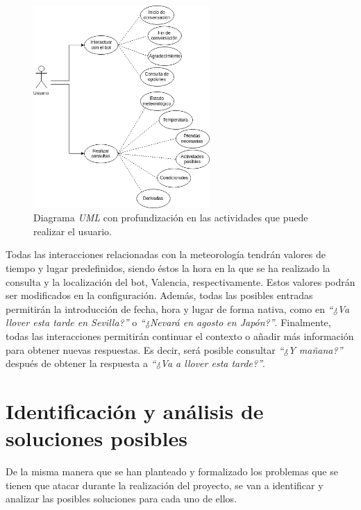 \documentclass[11pt,spanish,listoffigures]{tfgetsinf}
\begin{document}
\begin{figure}[h!]
    \centering
    \includegraphics[width=0.6\textwidth]{images/img04.png}
    \caption{Diagrama \textit{UML} con profundización en las actividades que puede realizar el usuario.}
    \label{fig:UML2}
\end{figure}

Todas las interacciones relacionadas con la meteorología tendrán valores de tiempo y lugar predefinidos, siendo éstos la hora en la que se ha realizado la consulta y la localización del bot, Valencia, respectivamente. Estos valores podrán ser modificados en la configuración. Además, todas las posibles entradas permitirán la introducción de fecha, hora y lugar de forma nativa, como en \textit{“¿Va llover esta tarde en Sevilla?”} o  \textit{“¿Nevará en agosto en Japón?”}. Finalmente, todas las interacciones permitirán continuar el contexto o añadir más información para obtener nuevas respuestas. Es decir, será posible consultar \textit{“¿Y mañana?”} después de obtener la respuesta a \textit{“¿Va a llover esta tarde?”}.



\section{Identificación y análisis de soluciones posibles}
\label{sec:identificacion-y-analisis-de-soluciones-posibles}

De la misma manera que se han planteado y formalizado los problemas que se tienen que atacar durante la realización del proyecto, se van a identificar y analizar las posibles soluciones para cada uno de ellos. 
\end{document}
